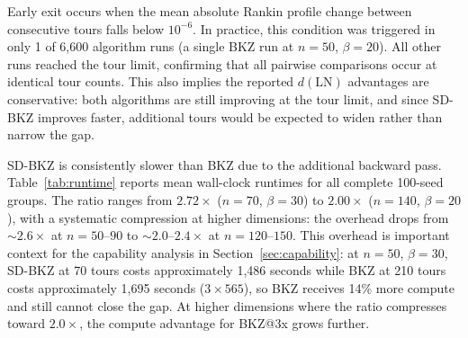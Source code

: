 \documentclass[journal=cic,version=preprint]{iacrj}
\begin{document}
Early exit occurs when the mean absolute Rankin profile change between consecutive tours falls below $10^{-6}$. In practice, this condition was triggered in only 1 of 6{,}600 algorithm runs (a single BKZ run at $n=50$, $\beta=20$). All other runs reached the tour limit, confirming that all pairwise comparisons occur at identical tour counts. This also implies the reported $d(\mathrm{LN})$ advantages are conservative: both algorithms are still improving at the tour limit, and since SD-BKZ improves faster, additional tours would be expected to widen rather than narrow the gap.

SD-BKZ is consistently slower than BKZ due to the additional backward pass. Table~\ref{tab:runtime} reports mean wall-clock runtimes for all complete 100-seed groups. The ratio ranges from $2.72\times$ ($n=70$, $\beta=30$) to $2.00\times$ ($n=140$, $\beta=20$), with a systematic compression at higher dimensions: the overhead drops from ${\sim}2.6\times$ at $n=50$--$90$ to ${\sim}2.0$--$2.4\times$ at $n=120$--$150$. This overhead is important context for the capability analysis in Section~\ref{sec:capability}: at $n=50$, $\beta=30$, SD-BKZ at 70 tours costs approximately 1{,}486 seconds while BKZ at 210 tours costs approximately 1{,}695 seconds ($3\times 565$), so BKZ receives 14\% more compute and still cannot close the gap. At higher dimensions where the ratio compresses toward $2.0\times$, the compute advantage for BKZ@3x grows further.
\end{document}

